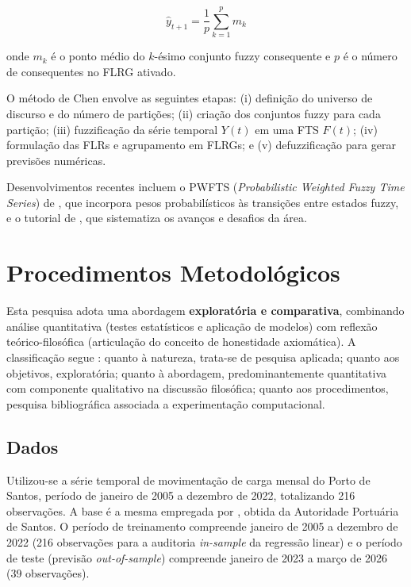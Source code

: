 \documentclass[
    12pt,
    oneside,
    openany,
    a4paper,
    english,
    brazil
]{abntex2}
\theoremstyle{definition}
\begin{document}
\begin{equation}
\hat{y}_{t+1} = \frac{1}{p}\sum_{k=1}^{p} m_k
\label{eq:chen}
\end{equation}

\noindent onde $m_k$ é o ponto médio do $k$-ésimo conjunto fuzzy consequente e $p$ é o número de consequentes no FLRG ativado.

O método de Chen envolve as seguintes etapas: (i) definição do universo de discurso e do número de partições; (ii) criação dos conjuntos fuzzy para cada partição; (iii) fuzzificação da série temporal $Y(t)$ em uma FTS $F(t)$; (iv) formulação das FLRs e agrupamento em FLRGs; e (v) defuzzificação para gerar previsões numéricas.

Desenvolvimentos recentes incluem o PWFTS (\textit{Probabilistic Weighted Fuzzy Time Series}) de , que incorpora pesos probabilísticos às transições entre estados fuzzy, e o tutorial de , que sistematiza os avanços e desafios da área.

\chapter{Procedimentos Metodológicos}
\label{cap:metodologia}

Esta pesquisa adota uma abordagem \textbf{exploratória e comparativa}, combinando análise quantitativa (testes estatísticos e aplicação de modelos) com reflexão teórico-filosófica (articulação do conceito de honestidade axiomática). A classificação segue : quanto à natureza, trata-se de pesquisa aplicada; quanto aos objetivos, exploratória; quanto à abordagem, predominantemente quantitativa com componente qualitativo na discussão filosófica; quanto aos procedimentos, pesquisa bibliográfica associada a experimentação computacional.

\section{Dados}
\label{sec:dados}

Utilizou-se a série temporal de movimentação de carga mensal do Porto de Santos, período de janeiro de 2005 a dezembro de 2022, totalizando 216 observações. A base é a mesma empregada por , obtida da Autoridade Portuária de Santos. O período de treinamento compreende janeiro de 2005 a dezembro de 2022 (216 observações para a auditoria \textit{in-sample} da regressão linear) e o período de teste (previsão \textit{out-of-sample}) compreende janeiro de 2023 a março de 2026 (39 observações).
\end{document}
